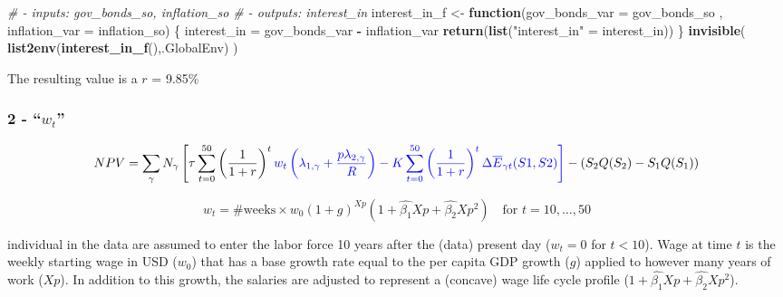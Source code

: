 \documentclass[]{article}
\newenvironment{Shaded}{\begin{snugshade}}{\end{snugshade}}
\newcommand{\CommentTok}[1]{\textcolor[rgb]{0.56,0.35,0.01}{\textit{#1}}}
\newcommand{\ControlFlowTok}[1]{\textcolor[rgb]{0.13,0.29,0.53}{\textbf{#1}}}
\newcommand{\DataTypeTok}[1]{\textcolor[rgb]{0.13,0.29,0.53}{#1}}
\newcommand{\KeywordTok}[1]{\textcolor[rgb]{0.13,0.29,0.53}{\textbf{#1}}}
\newcommand{\NormalTok}[1]{#1}
\newcommand{\OperatorTok}[1]{\textcolor[rgb]{0.81,0.36,0.00}{\textbf{#1}}}
\newcommand{\StringTok}[1]{\textcolor[rgb]{0.31,0.60,0.02}{#1}}
\begin{document}
\begin{Shaded}
\begin{Highlighting}[]
\CommentTok{# - inputs: gov_bonds_so, inflation_so}
\CommentTok{# - outputs: interest_in}
\NormalTok{interest_in_f <-}\StringTok{ }\ControlFlowTok{function}\NormalTok{(}\DataTypeTok{gov_bonds_var =}\NormalTok{ gov_bonds_so , }\DataTypeTok{inflation_var =}\NormalTok{ inflation_so) \{  }
\NormalTok{  interest_in =}\StringTok{ }\NormalTok{gov_bonds_var }\OperatorTok{-}\StringTok{ }\NormalTok{inflation_var }
  \KeywordTok{return}\NormalTok{(}\KeywordTok{list}\NormalTok{(}\StringTok{"interest_in"}\NormalTok{ =}\StringTok{ }\NormalTok{interest_in))}
\NormalTok{\}}
\KeywordTok{invisible}\NormalTok{( }\KeywordTok{list2env}\NormalTok{(}\KeywordTok{interest_in_f}\NormalTok{(),.GlobalEnv) )}
\end{Highlighting}
\end{Shaded}

The resulting value is a \(r\) = 9.85\%

\hypertarget{w_t}{%
\subsubsection{\texorpdfstring{2 -
``\(w_{t}\)''}{2 - ``w\_\{t\}''}}\label{w_t}}

\begin{equation}
NPV =  \sum_{\gamma} N_{\gamma} \left[
\tau \sum_{t=0}^{50}\left(  \frac{1}{1 + r}\right)^{t} \color{blue}{ w_{t} }
\left( \lambda_{1, \gamma} + \frac{p \lambda_{2, \gamma}}{R} \right) -
K \sum_{t=0}^{50} \left( \frac{1}{1 + r}\right)^{t} \Delta \overline{E}_{\gamma t}(S1,S2)
\right] - \left( S_{2}Q(S_{2}) - S_{1}Q(S_{1}) \right)
\end{equation}

\begin{equation}
w_t =  \text{#weeks} \times w_0 (1 + g)^{Xp}(1 + \hat{\beta_1} Xp + \hat{\beta_2} Xp^2) \quad \text{for } t=10, \dots, 50
\end{equation}

individual in the data are assumed to enter the labor force 10 years
after the (data) present day (\(w_t = 0\) for \(t<10\)). Wage at time
\(t\) is the weekly starting wage in USD (\(w_0\)) that has a base
growth rate equal to the per capita GDP growth (\(g\)) applied to
however many years of work (\(Xp\)). In addition to this growth, the
salaries are adjusted to represent a (concave) wage life cycle profile
(\(1 + \hat{\beta_1} Xp + \hat{\beta_2} Xp^2\)).
\end{document}
